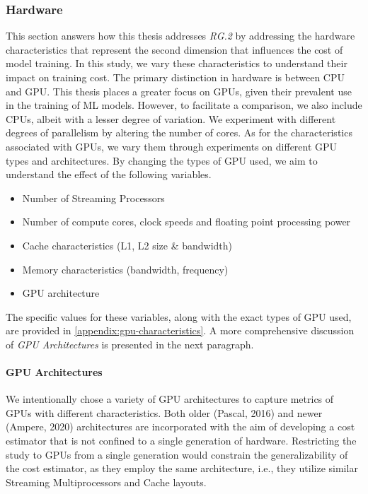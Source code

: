 \subsubsection{Hardware}
\label{subsubsec:4-hardware}
This section answers how this thesis addresses \emph{RG.2} by addressing the hardware characteristics that represent the second dimension that influences the cost of model training. In this study, we vary these characteristics to understand their impact on training cost. The primary distinction in hardware is between CPU and GPU. This thesis places a greater focus on GPUs, given their prevalent use in the training of ML models. However, to facilitate a comparison, we also include CPUs, albeit with a lesser degree of variation. We experiment with different degrees of parallelism by altering the number of cores. As for the characteristics associated with GPUs, we vary them through experiments on different GPU types and architectures. By changing the types of GPU used, we aim to understand the effect of the following variables.
\begin{itemize}
    \item Number of Streaming Processors
    \item Number of compute cores, clock speeds and floating point processing power
    \item Cache characteristics (L1, L2 size \& bandwidth)
    \item Memory characteristics (bandwidth, frequency)
    \item GPU architecture
\end{itemize}
The specific values for these variables, along with the exact types of GPU used, are provided in \autoref{appendix:gpu-characteristics}. A more comprehensive discussion of \textit{GPU Architectures} is presented in the next paragraph.

\paragraph{GPU Architectures}
We intentionally chose a variety of GPU architectures to capture metrics of GPUs with different characteristics. Both older (Pascal, 2016) and newer (Ampere, 2020) architectures are incorporated with the aim of developing a cost estimator that is not confined to a single generation of hardware. Restricting the study to GPUs from a single generation would constrain the generalizability of the cost estimator, as they employ the same architecture, i.e., they utilize similar Streaming Multiprocessors and Cache layouts.


